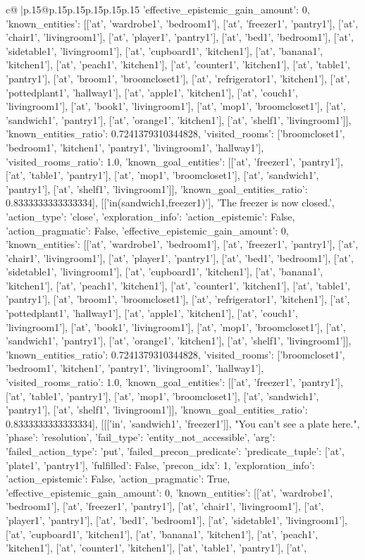 \documentclass{article}
\begin{document}
{\begin{supertabular}{c@{$\;$}|p{.15\linewidth}@{}p{.15\linewidth}p{.15\linewidth}p{.15\linewidth}p{.15\linewidth}p{.15\linewidth}}
{{{'effective_epistemic_gain_amount': 0, 'known_entities': [['at', 'wardrobe1', 'bedroom1'], ['at', 'freezer1', 'pantry1'], ['at', 'chair1', 'livingroom1'], ['at', 'player1', 'pantry1'], ['at', 'bed1', 'bedroom1'], ['at', 'sidetable1', 'livingroom1'], ['at', 'cupboard1', 'kitchen1'], ['at', 'banana1', 'kitchen1'], ['at', 'peach1', 'kitchen1'], ['at', 'counter1', 'kitchen1'], ['at', 'table1', 'pantry1'], ['at', 'broom1', 'broomcloset1'], ['at', 'refrigerator1', 'kitchen1'], ['at', 'pottedplant1', 'hallway1'], ['at', 'apple1', 'kitchen1'], ['at', 'couch1', 'livingroom1'], ['at', 'book1', 'livingroom1'], ['at', 'mop1', 'broomcloset1'], ['at', 'sandwich1', 'pantry1'], ['at', 'orange1', 'kitchen1'], ['at', 'shelf1', 'livingroom1']], 'known_entities_ratio': 0.7241379310344828, 'visited_rooms': ['broomcloset1', 'bedroom1', 'kitchen1', 'pantry1', 'livingroom1', 'hallway1'], 'visited_rooms_ratio': 1.0, 'known_goal_entities': [['at', 'freezer1', 'pantry1'], ['at', 'table1', 'pantry1'], ['at', 'mop1', 'broomcloset1'], ['at', 'sandwich1', 'pantry1'], ['at', 'shelf1', 'livingroom1']], 'known_goal_entities_ratio': 0.8333333333333334}}], [['in(sandwich1,freezer1)'], 'The freezer is now closed.', {'action_type': 'close', 'exploration_info': {'action_epistemic': False, 'action_pragmatic': False, 'effective_epistemic_gain_amount': 0, 'known_entities': [['at', 'wardrobe1', 'bedroom1'], ['at', 'freezer1', 'pantry1'], ['at', 'chair1', 'livingroom1'], ['at', 'player1', 'pantry1'], ['at', 'bed1', 'bedroom1'], ['at', 'sidetable1', 'livingroom1'], ['at', 'cupboard1', 'kitchen1'], ['at', 'banana1', 'kitchen1'], ['at', 'peach1', 'kitchen1'], ['at', 'counter1', 'kitchen1'], ['at', 'table1', 'pantry1'], ['at', 'broom1', 'broomcloset1'], ['at', 'refrigerator1', 'kitchen1'], ['at', 'pottedplant1', 'hallway1'], ['at', 'apple1', 'kitchen1'], ['at', 'couch1', 'livingroom1'], ['at', 'book1', 'livingroom1'], ['at', 'mop1', 'broomcloset1'], ['at', 'sandwich1', 'pantry1'], ['at', 'orange1', 'kitchen1'], ['at', 'shelf1', 'livingroom1']], 'known_entities_ratio': 0.7241379310344828, 'visited_rooms': ['broomcloset1', 'bedroom1', 'kitchen1', 'pantry1', 'livingroom1', 'hallway1'], 'visited_rooms_ratio': 1.0, 'known_goal_entities': [['at', 'freezer1', 'pantry1'], ['at', 'table1', 'pantry1'], ['at', 'mop1', 'broomcloset1'], ['at', 'sandwich1', 'pantry1'], ['at', 'shelf1', 'livingroom1']], 'known_goal_entities_ratio': 0.8333333333333334}}], [[['in', 'sandwich1', 'freezer1']], "You can't see a plate here.", {'phase': 'resolution', 'fail_type': 'entity_not_accessible', 'arg': {'failed_action_type': 'put', 'failed_precon_predicate': {'predicate_tuple': ['at', 'plate1', 'pantry1'], 'fulfilled': False, 'precon_idx': 1}}, 'exploration_info': {'action_epistemic': False, 'action_pragmatic': True, 'effective_epistemic_gain_amount': 0, 'known_entities': [['at', 'wardrobe1', 'bedroom1'], ['at', 'freezer1', 'pantry1'], ['at', 'chair1', 'livingroom1'], ['at', 'player1', 'pantry1'], ['at', 'bed1', 'bedroom1'], ['at', 'sidetable1', 'livingroom1'], ['at', 'cupboard1', 'kitchen1'], ['at', 'banana1', 'kitchen1'], ['at', 'peach1', 'kitchen1'], ['at', 'counter1', 'kitchen1'], ['at', 'table1', 'pantry1'], ['at', }}}
\end{supertabular}}
\end{document}
